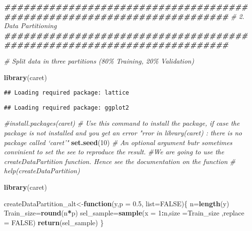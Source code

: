 \documentclass[
]{article}
\newenvironment{Shaded}{\begin{snugshade}}{\end{snugshade}}
\newcommand{\AttributeTok}[1]{\textcolor[rgb]{0.13,0.29,0.53}{#1}}
\newcommand{\CommentTok}[1]{\textcolor[rgb]{0.56,0.35,0.01}{\textit{#1}}}
\newcommand{\ConstantTok}[1]{\textcolor[rgb]{0.56,0.35,0.01}{#1}}
\newcommand{\ControlFlowTok}[1]{\textcolor[rgb]{0.13,0.29,0.53}{\textbf{#1}}}
\newcommand{\DecValTok}[1]{\textcolor[rgb]{0.00,0.00,0.81}{#1}}
\newcommand{\DocumentationTok}[1]{\textcolor[rgb]{0.56,0.35,0.01}{\textbf{\textit{#1}}}}
\newcommand{\FloatTok}[1]{\textcolor[rgb]{0.00,0.00,0.81}{#1}}
\newcommand{\FunctionTok}[1]{\textcolor[rgb]{0.13,0.29,0.53}{\textbf{#1}}}
\newcommand{\NormalTok}[1]{#1}
\newcommand{\OtherTok}[1]{\textcolor[rgb]{0.56,0.35,0.01}{#1}}
\newcommand{\SpecialCharTok}[1]{\textcolor[rgb]{0.81,0.36,0.00}{\textbf{#1}}}
\begin{document}
\begin{Shaded}
\begin{Highlighting}[]
\DocumentationTok{\#\#\#\#\#\#\#\#\#\#\#\#\#\#\#\#\#\#\#\#\#\#\#\#\#\#\#\#\#\#\#\#\#\#\#\#\#\#\#\#\#\#\#\#\#\#\#\#\#\#\#\#\#\#\#\#\#\#\#\#\#\#\#\#\#\#\#\#\#\#\#\#\#}
  \CommentTok{\# 2. Data Partitioning                      }
  \DocumentationTok{\#\#\#\#\#\#\#\#\#\#\#\#\#\#\#\#\#\#\#\#\#\#\#\#\#\#\#\#\#\#\#\#\#\#\#\#\#\#\#\#\#\#\#\#\#\#\#\#\#\#\#\#\#\#\#\#\#\#\#\#\#\#\#\#\#\#\#\#\#\#\#\#\#}
 
 \CommentTok{\# Split data in three partitions (80\% Training, 20\% Validation)}
 
  \FunctionTok{library}\NormalTok{(caret)}
\end{Highlighting}
\end{Shaded}

\begin{verbatim}
## Loading required package: lattice
\end{verbatim}

\begin{verbatim}
## Loading required package: ggplot2
\end{verbatim}

\begin{Shaded}
\begin{Highlighting}[]
\CommentTok{\#install.packages(\textquotesingle{}caret\textquotesingle{}) \# Use this command to install the package,  if case the package is not installed and you get an error "rror in library(caret) : there is no package called ‘caret’"}
  \FunctionTok{set.seed}\NormalTok{(}\DecValTok{10}\NormalTok{) }\CommentTok{\# An optional argument butr sometimes convinient to set the see to reproduce the result. }
  \CommentTok{\#We are going to use the createDataPartition function. Hence see the documentation on the function}
 \CommentTok{\# help(createDataPartition)}
\end{Highlighting}
\end{Shaded}

\begin{Shaded}
\begin{Highlighting}[]
\FunctionTok{library}\NormalTok{(caret)}

\NormalTok{createDataPartition\_alt}\OtherTok{\textless{}{-}}\ControlFlowTok{function}\NormalTok{(y,}\AttributeTok{p =} \FloatTok{0.5}\NormalTok{, }\AttributeTok{list=}\ConstantTok{FALSE}\NormalTok{)\{}
\NormalTok{  n}\OtherTok{=}\FunctionTok{length}\NormalTok{(y)}
\NormalTok{  Train\_size}\OtherTok{=}\FunctionTok{round}\NormalTok{(n}\SpecialCharTok{*}\NormalTok{p)}
\NormalTok{  sel\_sample}\OtherTok{=}\FunctionTok{sample}\NormalTok{(}\AttributeTok{x =} \DecValTok{1}\SpecialCharTok{:}\NormalTok{n,}\AttributeTok{size =}\NormalTok{Train\_size ,}\AttributeTok{replace =} \ConstantTok{FALSE}\NormalTok{)}
  \FunctionTok{return}\NormalTok{(sel\_sample)}
\NormalTok{\}}
\end{Highlighting}
\end{Shaded}
\end{document}
